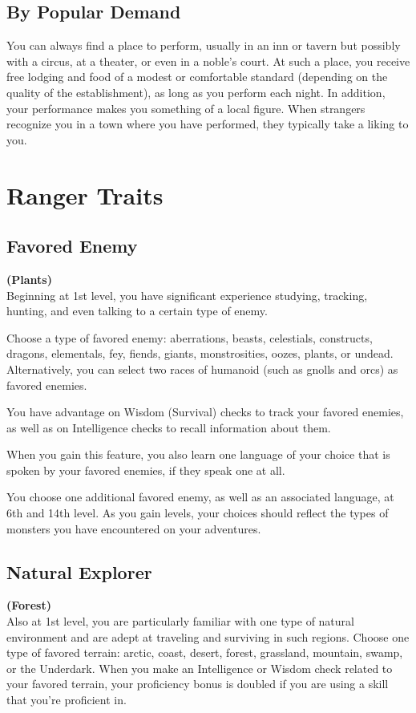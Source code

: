 {\subsection*{By Popular Demand}
You can always find a place to perform, usually in an inn or tavern but possibly with a circus, at a theater, or even in a noble's court. At such a place, you receive free lodging and food of a modest or comfortable standard (depending on the quality of the establishment), as long as you perform each night. In addition, your performance makes you something of a local figure. When strangers recognize you in a town where you have performed, they typically take a liking to you.

\section*{Ranger Traits}
\subsection*{Favored Enemy}
\textbf{(Plants)}\\
Beginning at 1st level, you have significant experience studying, tracking, hunting, and even talking to a certain type of enemy.

Choose a type of favored enemy: aberrations, beasts, celestials, constructs, dragons, elementals, fey, fiends, giants, monstrosities, oozes, plants, or undead. Alternatively, you can select two races of humanoid (such as gnolls and orcs) as favored enemies.

You have advantage on Wisdom (Survival) checks to track your favored enemies, as well as on Intelligence checks to recall information about them.

When you gain this feature, you also learn one language of your choice that is spoken by your favored enemies, if they speak one at all.

You choose one additional favored enemy, as well as an associated language, at 6th and 14th level. As you gain levels, your choices should reflect the types of monsters you have encountered on your adventures.
\subsection*{Natural Explorer}
\textbf{(Forest)}\\
Also at 1st level, you are particularly familiar with one type of natural environment and are adept at traveling and surviving in such regions. Choose one type of favored terrain: arctic, coast, desert, forest, grassland, mountain, swamp, or the Underdark. When you make an Intelligence or Wisdom check related to your favored terrain, your proficiency bonus is doubled if you are using a skill that you’re proficient in.

}
